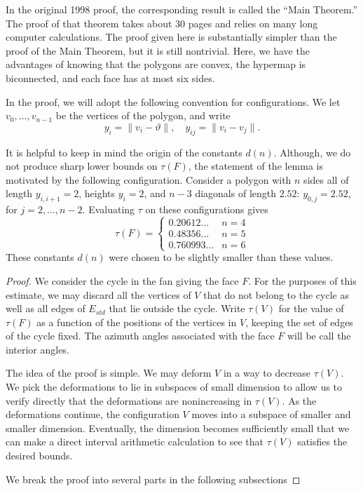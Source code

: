 In the original 1998 proof, the corresponding result
is called the ``Main Theorem.''  The proof of that 
theorem takes about 30 pages and relies on many
long computer calculations.  The proof given here
is substantially simpler than the proof of the
Main Theorem, but
it is still nontrivial.  Here, we have the advantages
of knowing that the polygons are convex, the hypermap
is biconnected, and each face has at most six sides.

In the proof, we will adopt the following convention for
configurations.  We let $v_0,\ldots,v_{n-1}$ be the vertices
of the polygon, and write
$$
y_i = \|v_i-\vartheta\|,\quad y_{ij} = \|v_i- v_j\|.
$$

It is helpful to keep in mind the origin of the constants $d(n)$.
Although, we do not produce sharp lower bounds on $\tau(F)$, the
statement of the lemma is motivated by the following configuration.
Consider a polygon with $n$ sides all of length $y_{i,i+1}=2$, heights
$y_i=2$, and $n-3$ diagonals of length $2.52$: $y_{0,j}=2.52$, for
$j=2,\ldots,n-2$.  Evaluating $\tau$ on these configurations gives
$$
\tau(F) = \begin{cases}
0.20612\ldots & n=4\\
0.48356\ldots & n=5\\
0.760993\ldots &n=6
\end{cases}
$$
These constants $d(n)$ were chosen to be slightly smaller than these values.


\begin{proof}  We consider the cycle in the fan
giving the face $F$.  For the purposes of this
estimate, we may discard all the vertices of $V$
that do not belong to the cycle as well as all edges
of $E_{std}$ that lie outside the cycle.
Write $\tau(V)$ for the value of $\tau(F)$ as a
function of the positions of the vertices in $V$,
keeping the set of edges of the cycle fixed.  The
azimuth angles associated with the face $F$ will be
call the interior angles.  

The idea of the proof is simple.  We may deform $V$ in a way to decrease $\tau(V)$.  We pick the deformations to lie in subspaces of small dimension to allow us to verify directly that the deformations are nonincreasing in $\tau(V)$.  As the deformations continue, the configuration $V$ moves into a subspace of smaller and smaller dimension.  Eventually, the dimension becomes sufficiently small that we can make a direct interval arithmetic calculation to see that $\tau(V)$ satisfies the desired bounds.

We break the proof into several parts in the following
subsections
\end{proof}


